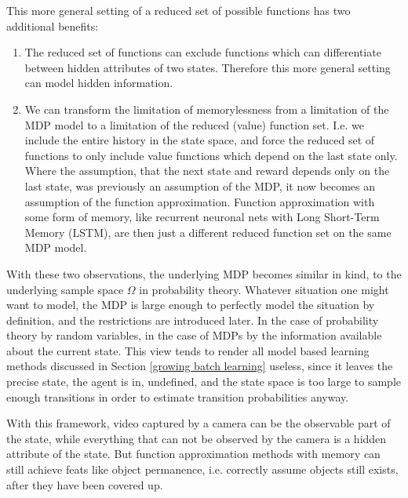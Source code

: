 This more general setting of a reduced set of possible functions has two additional benefits:
\begin{enumerate}
	\item The reduced set of functions can exclude functions which can differentiate between hidden attributes of two states. Therefore this more general setting can model hidden information. 
	\item We can transform the limitation of memorylessness from a limitation of the MDP model to a limitation of the reduced (value) function set. I.e. we include the entire history in the state space, and force the reduced set of functions to only include value functions which depend on the last state only. Where the assumption, that the next state and reward depends only on the last state, was previously an assumption of the MDP, it now becomes an assumption of the function approximation. Function approximation with some form of memory, like recurrent neuronal nets with Long Short-Term Memory (LSTM), are then just a different reduced function set on the same MDP model.
\end{enumerate}
With these two observations, the underlying MDP becomes similar in kind, to the underlying sample space \(\Omega\) in probability theory. Whatever situation one might want to model, the MDP is large enough to perfectly model the situation by definition, and the restrictions are introduced later. In the case of probability theory by random variables, in the case of MDPs by the information available about the current state. This view tends to render all model based learning methods discussed in Section \ref{growing batch learning} useless, since it leaves the precise state, the agent is in, undefined, and the state space is too large to sample enough transitions in order to estimate transition probabilities anyway.

With this framework, video captured by a camera can be the observable part of the state, while everything that can not be observed by the camera is a hidden attribute of the state. But function approximation methods with memory can still achieve feats like object permanence, i.e. correctly assume objects still exists, after they have been covered up. 

